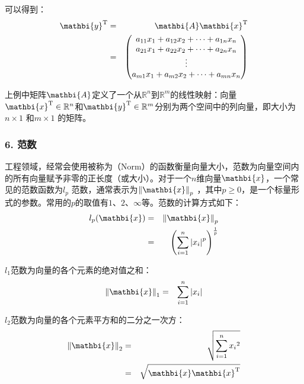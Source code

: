 \parinterval 可以得到：
\begin{eqnarray}
{\mathbi{y}}^{\textrm{T}}& = &{\mathbi{A}}{\mathbi{x}}^{\textrm{T}} \nonumber \\
               & = &
\begin{pmatrix}
   a_{11}x_{1}+a_{12}x_{2}+\dots+a_{1n}x_{n}\\
   a_{21}x_{1}+a_{22}x_{2}+\dots+a_{2n}x_{n}\\
   \vdots \\
   a_{m1}x_{1}+a_{m2}x_{2}+\dots+a_{mn}x_{n}
\label{eq:9-13}\end{pmatrix}
\end{eqnarray}

\parinterval 上例中矩阵$ {\mathbi{A}} $定义了一个从$ {\mathbb R}^n $到$ {\mathbb R}^m $的线性映射：向量$ {\mathbi{x}}^{\textrm{T}}\in {\mathbb R}^n $和$ {\mathbi{y}}^{\textrm{T}}\in {\mathbb R}^m $分别为两个空间中的列向量，即大小为$ n\times 1 $ 和$ m\times 1 $ 的矩阵。


\subsubsection{6. 范数}

\parinterval 工程领域，经常会使用被称为{\small{}}（Norm）的函数衡量向量大小，范数为向量空间内的所有向量赋予非零的正长度（或大小）。对于一个$n$维向量$ {\mathbi{x}} $，一个常见的范数函数为$ l_p $ 范数，通常表示为$ {\Vert{\mathbi{x}}\Vert}_p $ ，其中$p\ge 0$，是一个标量形式的参数。常用的$ p $的取值有$ 1 $、$ 2 $、$ \infty $等。范数的计算方式如下：
\begin{eqnarray}
l_p({\mathbi{x}}) & = & {\Vert{\mathbi{x}}\Vert}_p \nonumber \\
               & = & {\left (\sum_{i=1}^{n}{{\vert x_{i}\vert}^p}\right )}^{\frac{1}{p}}
\label{eq:9-14}
\end{eqnarray}

\parinterval $ l_1 $范数为向量的各个元素的绝对值之和：
\begin{eqnarray}
{\Vert{\mathbi{x}}\Vert}_1&=&\sum_{i=1}^{n}{\vert x_{i}\vert}
\label{eq:9-15}
\end{eqnarray}

\parinterval $ l_2 $范数为向量的各个元素平方和的二分之一次方：
\begin{eqnarray}
{\Vert{\mathbi{x}}\Vert}_2&=&\sqrt{\sum_{i=1}^{n}{{x_{i}}^2}} \nonumber \\
                                      &=&\sqrt{{{\mathbi{x}}\mathbi{x}}^{\textrm T}}
\label{eq:9-16}
\end{eqnarray}

